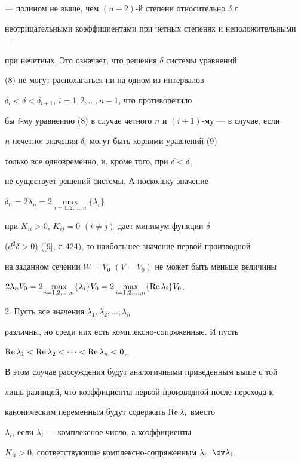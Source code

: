 \begin{pf}
--- полином не выше, чем $(n-2)$-й степени относительно $\delta $ с


неотрицательными коэффициентами при четных степенях и неположительными ---


при нечетных. Это означает, что решения $\delta $ системы уравнений


(8) не могут располагаться ни на одном из интервалов


$\delta_{i}<\delta <\delta_{i+1}$, $i=1,2,\dotsc, n-1$, что противоречило


бы $i$-му уравнению (8) в случае четного $n$ и $(i+1)$-му --- в случае, если


$n$ нечетно; значения $\delta_{i}$ могут быть корнями уравнений (9)


только все одновременно, и, кроме того, при $\delta <\delta_{1}$


не существует решений системы. А поскольку значение


$\delta_{n}=2\lambda_{n}=2\max\limits_{i=1,2,\dotsc,n} \{ \lambda_{i} \} $


при $K_{ii}>0$, $K_{ij}=0$ $(i\ne j)$ дает минимум функции $\delta $


($d^{2}\delta >0$) ([9], с.\,424), то наибольшее значение первой производной


на заданном сечении $W=V_{0}$ $(V=V_{0})$ не может быть меньше величины


$2\lambda_{n}V_{0}=2\max\limits_{i=1,2,\dotsc,n} \{ \lambda_{i} \} V_{0}


=2\max\limits_{i=1,2,\dotsc,n} \{ \re \lambda_{i} \} V_{0}$.





2. Пусть все значения $\lambda_{1},\lambda_{2},\dotsc,\lambda_{n}$


различны, но среди них есть комплексно-сопряженные. И пусть


$\operatorname{Re} \lambda_{1}<\operatorname{Re} \lambda_{2}<\dotsb <\operatorname{Re} \lambda_{n}<0$.


В этом случае рассуждения будут аналогичными приведенным выше с той


лишь разницей, что коэффициенты первой производной после перехода к


каноническим переменным будут содержать $\operatorname{Re} \lambda_{i}$ вместо


$\lambda_{i}$, если $\lambda_{i}$ --- комплексное число, а коэффициенты


$K_{ii}>0$, соответствующие комплексно-сопряженным $\lambda_i$, $\ov\lambda_i$,



\end{pf}
